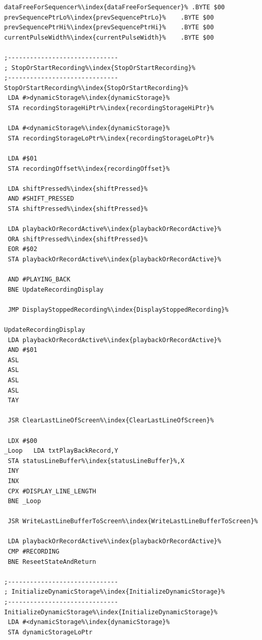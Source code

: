 \begin{minipage}[b]{0.33\linewidth}
\begin{lrbox}{\mybox}%
\begin{lstlisting}[basicstyle=\ttfamily\tiny,escapechar=\%]
dataFreeForSequencer%\index{dataFreeForSequencer}% .BYTE $00
prevSequencePtrLo%\index{prevSequencePtrLo}%    .BYTE $00
prevSequencePtrHi%\index{prevSequencePtrHi}%    .BYTE $00
currentPulseWidth%\index{currentPulseWidth}%    .BYTE $00

;------------------------------
; StopOrStartRecording%\index{StopOrStartRecording}%
;------------------------------
StopOrStartRecording%\index{StopOrStartRecording}%
 LDA #>dynamicStorage%\index{dynamicStorage}%
 STA recordingStorageHiPtr%\index{recordingStorageHiPtr}%

 LDA #<dynamicStorage%\index{dynamicStorage}%
 STA recordingStorageLoPtr%\index{recordingStorageLoPtr}%

 LDA #$01
 STA recordingOffset%\index{recordingOffset}%

 LDA shiftPressed%\index{shiftPressed}%
 AND #SHIFT_PRESSED
 STA shiftPressed%\index{shiftPressed}%

 LDA playbackOrRecordActive%\index{playbackOrRecordActive}%
 ORA shiftPressed%\index{shiftPressed}%
 EOR #$02
 STA playbackOrRecordActive%\index{playbackOrRecordActive}%

 AND #PLAYING_BACK
 BNE UpdateRecordingDisplay

 JMP DisplayStoppedRecording%\index{DisplayStoppedRecording}%

UpdateRecordingDisplay
 LDA playbackOrRecordActive%\index{playbackOrRecordActive}%
 AND #$01
 ASL
 ASL
 ASL
 ASL
 TAY

 JSR ClearLastLineOfScreen%\index{ClearLastLineOfScreen}%

 LDX #$00
_Loop   LDA txtPlayBackRecord,Y
 STA statusLineBuffer%\index{statusLineBuffer}%,X
 INY
 INX
 CPX #DISPLAY_LINE_LENGTH
 BNE _Loop

 JSR WriteLastLineBufferToScreen%\index{WriteLastLineBufferToScreen}%

 LDA playbackOrRecordActive%\index{playbackOrRecordActive}%
 CMP #RECORDING
 BNE ReseetStateAndReturn

;------------------------------
; InitializeDynamicStorage%\index{InitializeDynamicStorage}%
;------------------------------
InitializeDynamicStorage%\index{InitializeDynamicStorage}%
 LDA #<dynamicStorage%\index{dynamicStorage}%
 STA dynamicStorageLoPtr


\end{lstlisting}
\end{lrbox}
\end{minipage}
